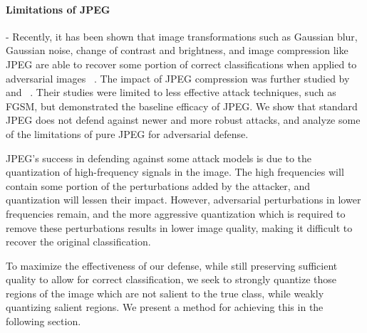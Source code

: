 

\paragraph{Limitations of JPEG} - Recently, it has been shown that image transformations such as Gaussian blur, Gaussian noise, change of contrast and brightness, and image compression like JPEG are able to recover some portion of correct classifications when applied to adversarial images ~\cite{Kurakin2016AdversarialEI}.
The impact of JPEG compression was further studied by ~\cite{Dziugaite2016ASO} and ~\cite{Das2017KeepingTB}.
Their studies were limited to less effective attack techniques, such as FGSM, but demonstrated the baseline efficacy of JPEG. 
We show that standard JPEG does not defend against newer and more robust attacks, and analyze some of the limitations of pure JPEG for adversarial defense.

JPEG's success in defending against some attack models is due to the quantization of high-frequency signals in the image.
The high frequencies will contain some portion of the perturbations added by the attacker, and quantization will lessen their impact.
However, adversarial perturbations in lower frequencies remain, and the more aggressive quantization which is required to remove these perturbations results in lower image quality, making it difficult to recover the original classification.



 

To maximize the effectiveness of our defense, while still preserving sufficient quality to allow for correct classification, we seek to strongly quantize those regions of the image which are not salient to the true class, while weakly quantizing salient regions.
We present a method for achieving this in the following section.

